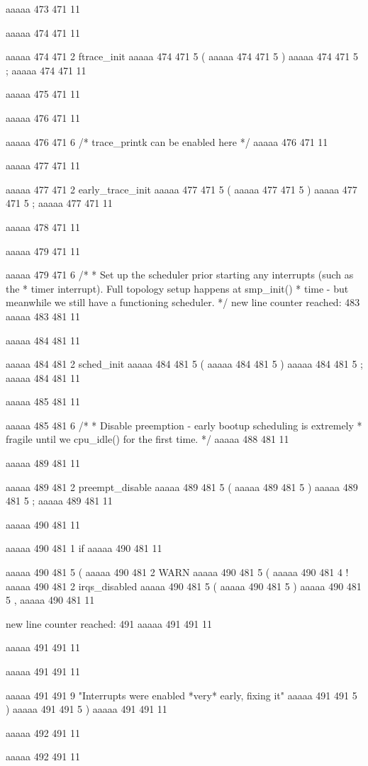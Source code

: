 {aaaaa 473 471
11


aaaaa 474 471
11
	
aaaaa 474 471
2
ftrace_init
aaaaa 474 471
5
(
aaaaa 474 471
5
)
aaaaa 474 471
5
;
aaaaa 474 471
11


aaaaa 475 471
11


aaaaa 476 471
11
	
aaaaa 476 471
6
/* trace_printk can be enabled here */
aaaaa 476 471
11


aaaaa 477 471
11
	
aaaaa 477 471
2
early_trace_init
aaaaa 477 471
5
(
aaaaa 477 471
5
)
aaaaa 477 471
5
;
aaaaa 477 471
11


aaaaa 478 471
11


aaaaa 479 471
11
	
aaaaa 479 471
6
/*
	 * Set up the scheduler prior starting any interrupts (such as the
	 * timer interrupt). Full topology setup happens at smp_init()
	 * time - but meanwhile we still have a functioning scheduler.
	 */
new line counter reached: 483
aaaaa 483 481
11


aaaaa 484 481
11
	
aaaaa 484 481
2
sched_init
aaaaa 484 481
5
(
aaaaa 484 481
5
)
aaaaa 484 481
5
;
aaaaa 484 481
11


aaaaa 485 481
11
	
aaaaa 485 481
6
/*
	 * Disable preemption - early bootup scheduling is extremely
	 * fragile until we cpu_idle() for the first time.
	 */
aaaaa 488 481
11


aaaaa 489 481
11
	
aaaaa 489 481
2
preempt_disable
aaaaa 489 481
5
(
aaaaa 489 481
5
)
aaaaa 489 481
5
;
aaaaa 489 481
11


aaaaa 490 481
11
	
aaaaa 490 481
1
if
aaaaa 490 481
11
 
aaaaa 490 481
5
(
aaaaa 490 481
2
WARN
aaaaa 490 481
5
(
aaaaa 490 481
4
!
aaaaa 490 481
2
irqs_disabled
aaaaa 490 481
5
(
aaaaa 490 481
5
)
aaaaa 490 481
5
,
aaaaa 490 481
11


new line counter reached: 491
aaaaa 491 491
11
	
aaaaa 491 491
11
	
aaaaa 491 491
11
 
aaaaa 491 491
9
"Interrupts were enabled *very* early, fixing it\n"
aaaaa 491 491
5
)
aaaaa 491 491
5
)
aaaaa 491 491
11


aaaaa 492 491
11
	
aaaaa 492 491
11
	
}

